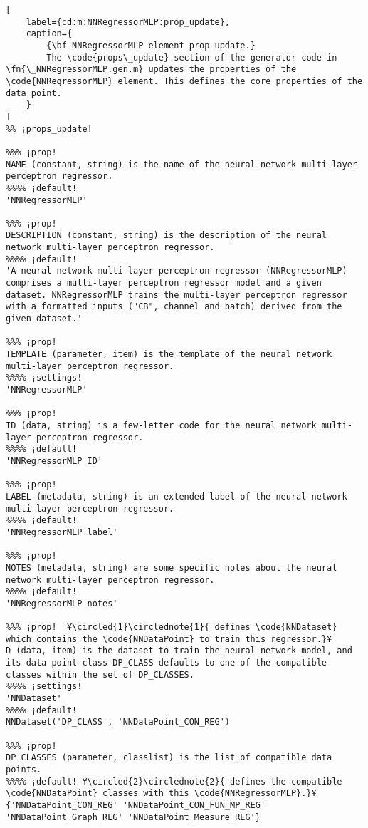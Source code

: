 \documentclass{tufte-handout}
\begin{document}
\begin{lstlisting}[
	label={cd:m:NNRegressorMLP:prop_update},
	caption={
		{\bf NNRegressorMLP element prop update.}
		The \code{props\_update} section of the generator code in \fn{\_NNRegressorMLP.gen.m} updates the properties of the \code{NNRegressorMLP} element. This defines the core properties of the data point.
	}
]
%% ¡props_update!

%%% ¡prop!
NAME (constant, string) is the name of the neural network multi-layer perceptron regressor.
%%%% ¡default!
'NNRegressorMLP'

%%% ¡prop!
DESCRIPTION (constant, string) is the description of the neural network multi-layer perceptron regressor.
%%%% ¡default!
'A neural network multi-layer perceptron regressor (NNRegressorMLP) comprises a multi-layer perceptron regressor model and a given dataset. NNRegressorMLP trains the multi-layer perceptron regressor with a formatted inputs ("CB", channel and batch) derived from the given dataset.'

%%% ¡prop!
TEMPLATE (parameter, item) is the template of the neural network multi-layer perceptron regressor.
%%%% ¡settings!
'NNRegressorMLP'

%%% ¡prop!
ID (data, string) is a few-letter code for the neural network multi-layer perceptron regressor.
%%%% ¡default!
'NNRegressorMLP ID'

%%% ¡prop!
LABEL (metadata, string) is an extended label of the neural network multi-layer perceptron regressor.
%%%% ¡default!
'NNRegressorMLP label'

%%% ¡prop!
NOTES (metadata, string) are some specific notes about the neural network multi-layer perceptron regressor.
%%%% ¡default!
'NNRegressorMLP notes'

%%% ¡prop!  ¥\circled{1}\circlednote{1}{ defines \code{NNDataset} which contains the \code{NNDataPoint} to train this regressor.}¥
D (data, item) is the dataset to train the neural network model, and its data point class DP_CLASS defaults to one of the compatible classes within the set of DP_CLASSES.
%%%% ¡settings!
'NNDataset'
%%%% ¡default!
NNDataset('DP_CLASS', 'NNDataPoint_CON_REG')

%%% ¡prop!
DP_CLASSES (parameter, classlist) is the list of compatible data points.
%%%% ¡default! ¥\circled{2}\circlednote{2}{ defines the compatible \code{NNDataPoint} classes with this \code{NNRegressorMLP}.}¥
{'NNDataPoint_CON_REG' 'NNDataPoint_CON_FUN_MP_REG' 'NNDataPoint_Graph_REG' 'NNDataPoint_Measure_REG'}


\end{lstlisting}
\end{document}
